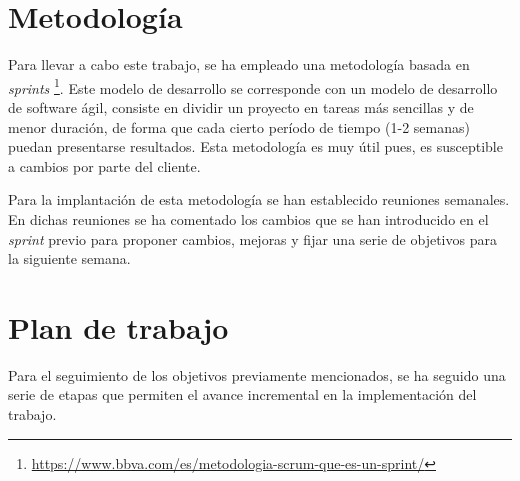 \documentclass[a4paper, 12pt]{book}
\begin{document}
\section{Metodología}
\label{sec:metodologia}

Para llevar a cabo este trabajo, se ha empleado una metodología basada en \emph{sprints} \footnote{\url{https://www.bbva.com/es/metodologia-scrum-que-es-un-sprint/}}. Este modelo de desarrollo se corresponde con un modelo de desarrollo de software ágil, consiste en dividir un proyecto en tareas más sencillas y de menor duración, de forma que cada cierto período de tiempo (1-2 semanas) puedan presentarse resultados. Esta metodología es muy útil pues, es susceptible a cambios por parte del cliente.

Para la implantación de esta metodología se han establecido reuniones semanales. En dichas reuniones se ha comentado los cambios que se han introducido en el \emph{sprint} previo para proponer cambios, mejoras y fijar una serie de objetivos para la siguiente semana.


\section{Plan de trabajo}
\label{sec:plan-de-trabajo}

Para el seguimiento de los objetivos previamente mencionados, se ha seguido una serie de etapas que permiten el avance incremental en la implementación del trabajo.
\end{document}
